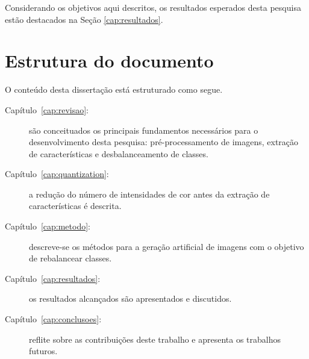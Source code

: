 Considerando os objetivos aqui descritos, os resultados esperados desta pesquisa estão destacados na Seção \ref{cap:resultados}.

\section{Estrutura do documento}

O conteúdo desta dissertação está estruturado como segue.

\begin{description}
\item [Capítulo~\ref{cap:revisao}:] são conceituados os principais fundamentos necessários para o desenvolvimento desta pesquisa: pré-processamento de imagens, extração de características e desbalanceamento de classes.

\item [Capítulo~\ref{cap:quantization}:] a redução do número de intensidades de cor antes da extração de características é descrita.

\item [Capítulo~\ref{cap:metodo}:] descreve-se os métodos para a geração artificial de imagens com o objetivo de rebalancear classes.

\item [Capítulo~\ref{cap:resultados}:] os resultados alcançados são apresentados e discutidos.

\item [Capítulo~\ref{cap:conclusoes}:] reflite sobre as contribuições deste trabalho e apresenta os trabalhos futuros.

\end{description}
